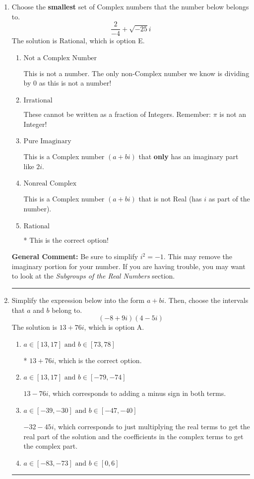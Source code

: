 \documentclass{extbook}[14pt]
\newcommand{\litem}[1]{\item #1

\rule{\textwidth}{0.4pt}}
\begin{document}
\begin{enumerate}\litem{
Choose the \textbf{smallest} set of Complex numbers that the number below belongs to.
\[ \frac{2}{-4}+\sqrt{-25}i \]The solution is \( \text{Rational} \), which is option E.\begin{enumerate}[label=\Alph*.]
\item \( \text{Not a Complex Number} \)

This is not a number. The only non-Complex number we know is dividing by 0 as this is not a number!
\item \( \text{Irrational} \)

These cannot be written as a fraction of Integers. Remember: $\pi$ is not an Integer!
\item \( \text{Pure Imaginary} \)

This is a Complex number $(a+bi)$ that \textbf{only} has an imaginary part like $2i$.
\item \( \text{Nonreal Complex} \)

This is a Complex number $(a+bi)$ that is not Real (has $i$ as part of the number).
\item \( \text{Rational} \)

* This is the correct option!
\end{enumerate}

\textbf{General Comment:} Be sure to simplify $i^2 = -1$. This may remove the imaginary portion for your number. If you are having trouble, you may want to look at the \textit{Subgroups of the Real Numbers} section.
}
\litem{
Simplify the expression below into the form $a+bi$. Then, choose the intervals that $a$ and $b$ belong to.
\[ (-8 + 9 i)(4 - 5 i) \]The solution is \( 13 + 76 i \), which is option A.\begin{enumerate}[label=\Alph*.]
\item \( a \in [13, 17] \text{ and } b \in [73, 78] \)

* $13 + 76 i$, which is the correct option.
\item \( a \in [13, 17] \text{ and } b \in [-79, -74] \)

 $13 - 76 i$, which corresponds to adding a minus sign in both terms.
\item \( a \in [-39, -30] \text{ and } b \in [-47, -40] \)

 $-32 - 45 i$, which corresponds to just multiplying the real terms to get the real part of the solution and the coefficients in the complex terms to get the complex part.
\item \( a \in [-83, -73] \text{ and } b \in [0, 6] \)


\end{enumerate}}
\end{enumerate}
\end{document}
